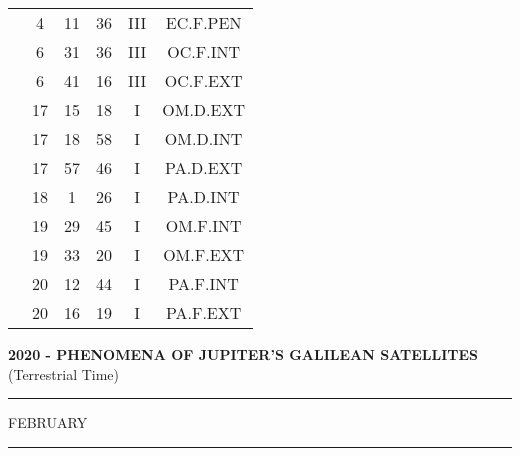 \documentclass[12pt, a4paper]{article}
\begin{document}
\begin{multicols}{3}
{\begin{tabular}{c c c c c c}
	 	 	 	 & 4 & 11 & 36 & III & EC.F.PEN\\%
	 	 	 	 & 6 & 31 & 36 & III & OC.F.INT\\%
	 	 	 	 & 6 & 41 & 16 & III & OC.F.EXT\\%
	 	 	 	 & 17 & 15 & 18 & I & OM.D.EXT\\%
	 	 	 	 & 17 & 18 & 58 & I & OM.D.INT\\%
	 	 	 	 & 17 & 57 & 46 & I & PA.D.EXT\\%
	 	 	 	 & 18 & 1 & 26 & I & PA.D.INT\\%
	 	 	 	 & 19 & 29 & 45 & I & OM.F.INT\\%
	 	 	 	 & 19 & 33 & 20 & I & OM.F.EXT\\%
	 	 	 	 & 20 & 12 & 44 & I & PA.F.INT\\%
	 	 	 	 & 20 & 16 & 19 & I & PA.F.EXT\\%
	 	 \end{tabular}
 	}
\end{multicols}
\textbf{2020 - PHENOMENA OF JUPITER'S GALILEAN SATELLITES}\\(Terrestrial Time) 
\vspace{0.1cm} \hrule \vspace{0.1cm}
FEBRUARY\vspace{0.1cm}
\hrule
\vspace{-0.2cm}
\end{document}
